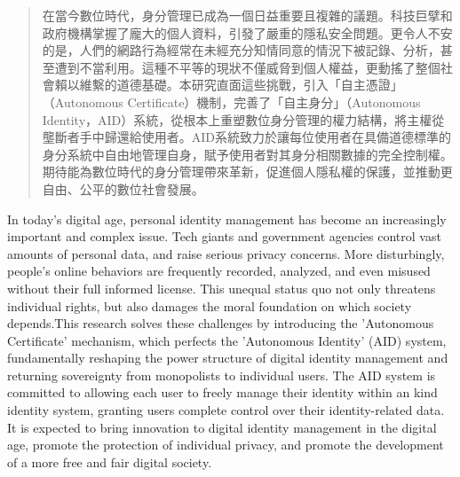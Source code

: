 
\begin{abstract}
  在當今數位時代，身分管理已成為一個日益重要且複雜的議題。科技巨擘和政府機構掌握了龐大的個人資料，引發了嚴重的隱私安全問題。更令人不安的是，人們的網路行為經常在未經充分知情同意的情況下被記錄、分析，甚至遭到不當利用。這種不平等的現狀不僅威脅到個人權益，更動搖了整個社會賴以維繫的道德基礎。本研究直面這些挑戰，引入「自主憑證」（Autonomous Certificate）機制，完善了「自主身分」（Autonomous Identity，AID）系統，從根本上重塑數位身分管理的權力結構，將主權從壟斷者手中歸還給使用者。AID系統致力於讓每位使用者在具備道德標準的身分系統中自由地管理自身，賦予使用者對其身分相關數據的完全控制權。期待能為數位時代的身分管理帶來革新，促進個人隱私權的保護，並推動更自由、公平的數位社會發展。
\end{abstract}

\begin{abstract*}
  In today's digital age, personal identity management has become an increasingly important and complex issue. Tech giants and government agencies control vast amounts of personal data, and raise serious privacy concerns. More disturbingly, people's online behaviors are frequently recorded, analyzed, and even misused without their full informed license. This unequal status quo not only threatens individual rights, but also damages the moral foundation on which society depends.This research solves these challenges by introducing the 'Autonomous Certificate' mechanism, which perfects the 'Autonomous Identity' (AID) system, fundamentally reshaping the power structure of digital identity management and returning sovereignty from monopolists to individual users. The AID system is committed to allowing each user to freely manage their identity within an kind identity system, granting users complete control over their identity-related data. It is expected to bring innovation to digital identity management in the digital age, promote the protection of individual privacy, and promote the development of a more free and fair digital society.
\end{abstract*}